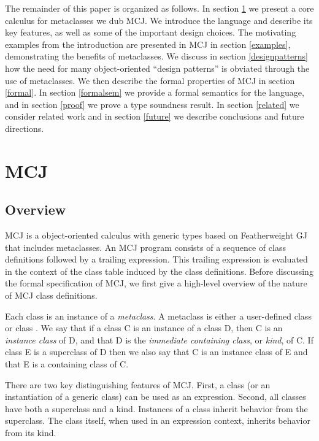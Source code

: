 \documentclass[10pt]{acm-sigplan}
\begin{document}
The remainder of this paper is organized as follows.  In section
\ref{MCJ} we present a core calculus for metaclasses we dub MCJ.
We introduce the language and describe its key features, as
well as some of the important design choices.  The motivating examples
from the introduction are presented in MCJ in section \ref{examples},
demonstrating the benefits of metaclasses. We discuss in section
\ref{designpatterns} how the need for many object-oriented ``design
patterns'' is obviated through the use of metaclasses. We then
describe the formal properties of MCJ in section \ref{formal}.  In section
\ref{formalsem} we provide a formal semantics for the language, and in
section \ref{proof} we prove a type soundness result.  In section
\ref{related} we consider related work and in section \ref{future} we
describe conclusions and future directions.


\section{MCJ}
\label{MCJ}

\subsection{Overview}

\label{MCJintro}

MCJ is a object-oriented calculus with generic types based on
Featherweight GJ that includes metaclasses. An MCJ program consists of
a sequence of class definitions followed by a trailing
expression. This trailing expression is evaluated in the context of
the class table induced by the class definitions.  Before discussing
the formal specification of MCJ, we first give a high-level overview
of the nature of MCJ class definitions.

Each class is an instance of a \emph{metaclass}.  A metaclass is
either a user-defined class or class {}.  We say that if a
class {\txt C} is an instance of a class {\txt D}, then {\txt C} is an
\emph{instance class} of {\txt D}, and that {\txt D} is the
\emph{immediate containing class}, or \emph{kind}, of {\txt C}.  If
class {\txt E} is a superclass of {\txt D} then we also say that {\txt
C} is an instance class of {\txt E} and that {\txt E} is a containing
class of {\txt C}.

There are two key distinguishing features of MCJ. First, a class (or
an instantiation of a generic class) can be used as an expression.
Second, all classes have both a superclass and a kind. Instances of a
class inherit behavior from the superclass. The class itself, when
used in an expression context, inherits behavior from its kind.
\end{document}
